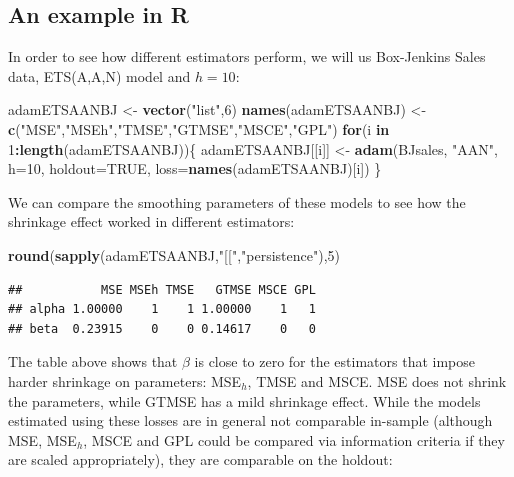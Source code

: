 \documentclass[]{book}
\newenvironment{Shaded}{\begin{snugshade}}{\end{snugshade}}
\newcommand{\ControlFlowTok}[1]{\textcolor[rgb]{0.13,0.29,0.53}{\textbf{#1}}}
\newcommand{\DataTypeTok}[1]{\textcolor[rgb]{0.13,0.29,0.53}{#1}}
\newcommand{\DecValTok}[1]{\textcolor[rgb]{0.00,0.00,0.81}{#1}}
\newcommand{\KeywordTok}[1]{\textcolor[rgb]{0.13,0.29,0.53}{\textbf{#1}}}
\newcommand{\NormalTok}[1]{#1}
\newcommand{\OperatorTok}[1]{\textcolor[rgb]{0.81,0.36,0.00}{\textbf{#1}}}
\newcommand{\OtherTok}[1]{\textcolor[rgb]{0.56,0.35,0.01}{#1}}
\newcommand{\StringTok}[1]{\textcolor[rgb]{0.31,0.60,0.02}{#1}}
\theoremstyle{definition}
\theoremstyle{definition}
\theoremstyle{definition}
\theoremstyle{definition}
\theoremstyle{remark}
\begin{document}
\hypertarget{an-example-in-r-2}{%
\subsection{An example in R}\label{an-example-in-r-2}}

In order to see how different estimators perform, we will us Box-Jenkins Sales data, ETS(A,A,N) model and \(h=10\):

\begin{Shaded}
\begin{Highlighting}[]
\NormalTok{adamETSAANBJ <-}\StringTok{ }\KeywordTok{vector}\NormalTok{(}\StringTok{"list"}\NormalTok{,}\DecValTok{6}\NormalTok{)}
\KeywordTok{names}\NormalTok{(adamETSAANBJ) <-}\StringTok{ }\KeywordTok{c}\NormalTok{(}\StringTok{"MSE"}\NormalTok{,}\StringTok{"MSEh"}\NormalTok{,}\StringTok{"TMSE"}\NormalTok{,}\StringTok{"GTMSE"}\NormalTok{,}\StringTok{"MSCE"}\NormalTok{,}\StringTok{"GPL"}\NormalTok{)}
\ControlFlowTok{for}\NormalTok{(i }\ControlFlowTok{in} \DecValTok{1}\OperatorTok{:}\KeywordTok{length}\NormalTok{(adamETSAANBJ))\{}
\NormalTok{    adamETSAANBJ[[i]] <-}\StringTok{ }\KeywordTok{adam}\NormalTok{(BJsales, }\StringTok{"AAN"}\NormalTok{, }\DataTypeTok{h=}\DecValTok{10}\NormalTok{, }\DataTypeTok{holdout=}\OtherTok{TRUE}\NormalTok{,}
                              \DataTypeTok{loss=}\KeywordTok{names}\NormalTok{(adamETSAANBJ)[i])}
\NormalTok{\}}
\end{Highlighting}
\end{Shaded}

We can compare the smoothing parameters of these models to see how the shrinkage effect worked in different estimators:

\begin{Shaded}
\begin{Highlighting}[]
\KeywordTok{round}\NormalTok{(}\KeywordTok{sapply}\NormalTok{(adamETSAANBJ,}\StringTok{"[["}\NormalTok{,}\StringTok{"persistence"}\NormalTok{),}\DecValTok{5}\NormalTok{)}
\end{Highlighting}
\end{Shaded}

\begin{verbatim}
##           MSE MSEh TMSE   GTMSE MSCE GPL
## alpha 1.00000    1    1 1.00000    1   1
## beta  0.23915    0    0 0.14617    0   0
\end{verbatim}

The table above shows that \(\beta\) is close to zero for the estimators that impose harder shrinkage on parameters: MSE\(_h\), TMSE and MSCE. MSE does not shrink the parameters, while GTMSE has a mild shrinkage effect. While the models estimated using these losses are in general not comparable in-sample (although MSE, MSE\(_h\), MSCE and GPL could be compared via information criteria if they are scaled appropriately), they are comparable on the holdout:
\end{document}
